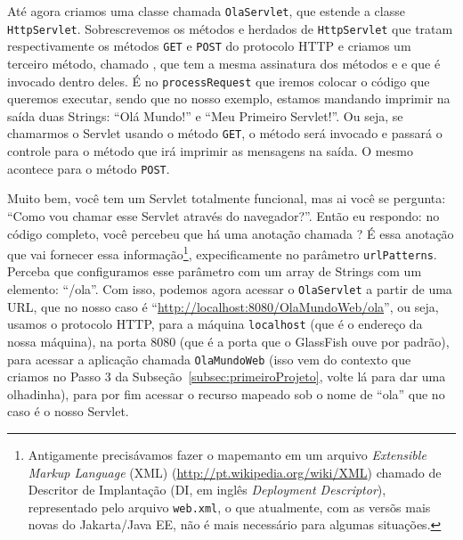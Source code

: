 Até agora criamos uma classe chamada \texttt{OlaServlet}, que estende a classe \texttt{HttpServlet}. Sobrescrevemos os métodos  e  herdados de \texttt{HttpServlet} que tratam respectivamente os métodos \texttt{GET} e \texttt{POST} do protocolo HTTP e criamos um terceiro método, chamado , que tem a mesma assinatura dos métodos  e  e que é invocado dentro deles. É no \texttt{processRequest} que iremos colocar o código que queremos executar, sendo que no nosso exemplo, estamos mandando imprimir na saída duas Strings: ``Olá Mundo!'' e ``Meu Primeiro Servlet!''. Ou seja, se chamarmos o Servlet usando o método \texttt{GET}, o método  será invocado e passará o controle para o método  que irá imprimir as mensagens na saída. O mesmo acontece para o método \texttt{POST}.

Muito bem, você tem um Servlet totalmente funcional, mas ai você se pergunta: ``Como vou chamar esse Servlet através do navegador?''. Então eu respondo: no código completo, você percebeu que há uma anotação chamada ? É essa anotação que vai fornecer essa informação\footnote{Antigamente precisávamos fazer o mapemanto em um arquivo \textit{Extensible Markup Language} (XML) (\url{http://pt.wikipedia.org/wiki/XML}) chamado de Descritor de Implantação (DI, em inglês \textit{Deployment Descriptor}), representado pelo arquivo \texttt{web.xml}, o que atualmente, com as versõs mais novas do Jakarta/Java EE, não é mais necessário para algumas situações.}, expecificamente no parâmetro \texttt{urlPatterns}. Perceba que configuramos esse parâmetro com um array de Strings com um elemento: ``/ola''. Com isso, podemos agora acessar o \texttt{OlaServlet} a partir de uma URL, que no nosso caso é ``\url{http://localhost:8080/OlaMundoWeb/ola}'', ou seja, usamos o protocolo HTTP, para a máquina \texttt{localhost} (que é o endereço da nossa máquina), na porta 8080 (que é a porta que o GlassFish ouve por padrão), para acessar a aplicação chamada \texttt{OlaMundoWeb} (isso vem do contexto que criamos no Passo 3 da Subseção~\ref{subsec:primeiroProjeto}, volte lá para dar uma olhadinha), para por fim acessar o recurso mapeado sob o nome de ``ola'' que no caso é o nosso Servlet. 

